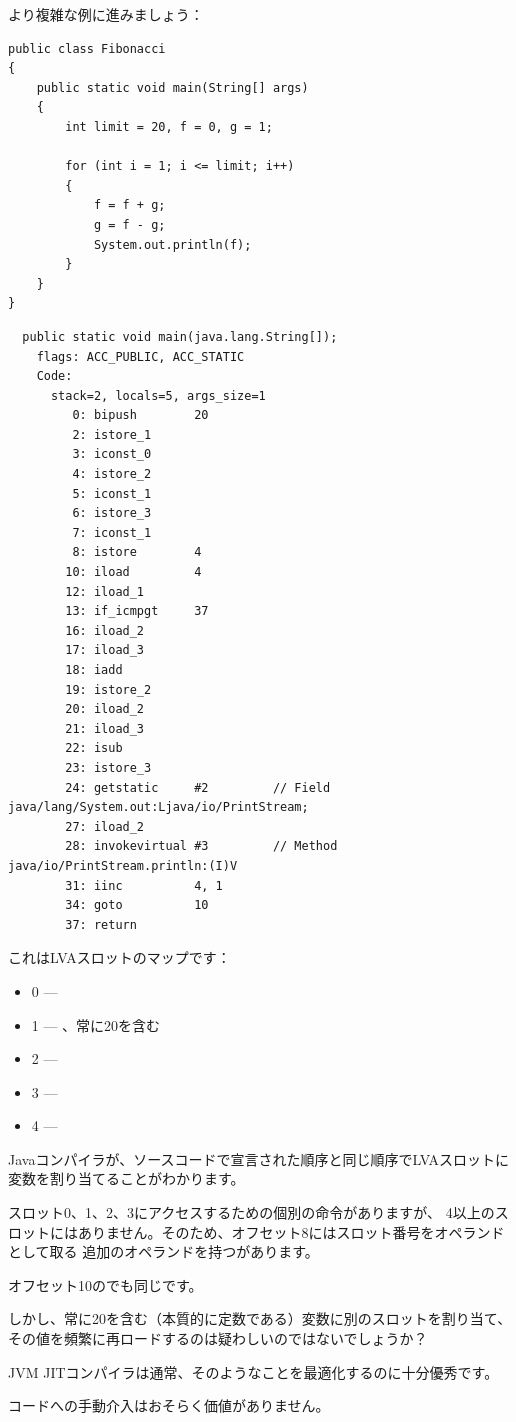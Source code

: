 より複雑な例に進みましょう：

\begin{lstlisting}[style=customjava]
public class Fibonacci
{
	public static void main(String[] args)
	{ 
		int limit = 20, f = 0, g = 1;

		for (int i = 1; i <= limit; i++)
		{
			f = f + g;
			g = f - g;
			System.out.println(f); 
		}
	}
}
\end{lstlisting}

\begin{lstlisting}
  public static void main(java.lang.String[]);
    flags: ACC_PUBLIC, ACC_STATIC
    Code:
      stack=2, locals=5, args_size=1
         0: bipush        20
         2: istore_1      
         3: iconst_0      
         4: istore_2      
         5: iconst_1      
         6: istore_3      
         7: iconst_1      
         8: istore        4
        10: iload         4
        12: iload_1       
        13: if_icmpgt     37
        16: iload_2       
        17: iload_3       
        18: iadd          
        19: istore_2      
        20: iload_2       
        21: iload_3       
        22: isub          
        23: istore_3      
        24: getstatic     #2         // Field java/lang/System.out:Ljava/io/PrintStream;
        27: iload_2       
        28: invokevirtual #3         // Method java/io/PrintStream.println:(I)V
        31: iinc          4, 1
        34: goto          10
        37: return        
\end{lstlisting}
        
これは\ac{LVA}スロットのマップです：

\begin{itemize}
\item 0 --- 
\item 1 --- 、常に20を含む
\item 2 --- 
\item 3 --- 
\item 4 --- 
\end{itemize}

Javaコンパイラが、ソースコードで宣言された順序と同じ順序で\ac{LVA}スロットに変数を割り当てることがわかります。

スロット0、1、2、3にアクセスするための個別の命令がありますが、
4以上のスロットにはありません。そのため、オフセット8にはスロット番号をオペランドとして取る
追加のオペランドを持つがあります。

オフセット10のでも同じです。

しかし、常に20を含む（本質的に定数である）変数に別のスロットを割り当て、
その値を頻繁に再ロードするのは疑わしいのではないでしょうか？

\ac{JVM} \ac{JIT}コンパイラは通常、そのようなことを最適化するのに十分優秀です。

コードへの手動介入はおそらく価値がありません。